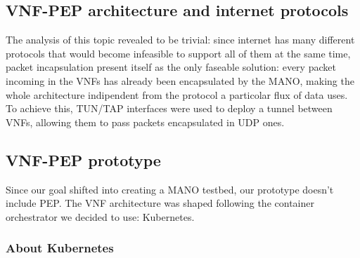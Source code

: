 \documentclass[10pt]{book}
\begin{document}
\subsection{VNF-PEP architecture and internet protocols}

The analysis of this topic revealed to be trivial: since internet has many
different protocols that would become infeasible to support all of them at the
same time, packet incapsulation present itself as the only faseable solution:
every packet incoming in the VNFs has already been encapsulated by the MANO,
 making the whole architecture indipendent from the
protocol a particolar flux of data uses. To achieve this, TUN/TAP interfaces 
were used to deploy a tunnel between VNFs, allowing them to pass packets 
encapsulated in UDP ones.

\subsection{VNF-PEP prototype}

Since our goal shifted into creating a MANO testbed, our prototype doesn't
include PEP. The VNF architecture was shaped following the container
orchestrator we decided to use: Kubernetes.

\subsubsection{About Kubernetes}
\end{document}
